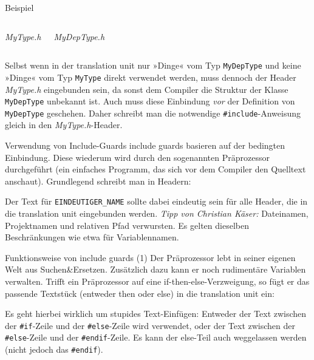 \begin{frame}[fragile]{Beispiel}
	\scriptsize
	\begin{columns}[t]
		\emph{MyType.h}
		
		
		\emph{MyDepType.h}
		
	\end{columns}
	
	\vspace{1em}
	{\footnotesize
	Selbst wenn in der translation unit nur »Dinge« vom Typ \verb|MyDepType| und keine »Dinge« vom Typ \verb|MyType| direkt verwendet werden, muss dennoch der Header \emph{MyType.h} eingebunden sein, da sonst dem Compiler die Struktur der Klasse \verb|MyDepType| unbekannt ist. Auch muss diese Einbindung \emph{vor} der Definition von \verb|MyDepType| geschehen. Daher schreibt man die notwendige \verb|#include|-Anweisung gleich in den \emph{MyType.h}-Header.
	}
\end{frame}

\begin{frame}[fragile]{Verwendung von Include-Guards}
	include guards basieren auf der bedingten Einbindung. Diese wiederum wird durch den sogenannten Präprozessor durchgeführt (ein einfaches Programm, das sich vor dem Compiler den Quelltext anschaut). Grundlegend schreibt man in Headern:
	
	\vspace{0.5em}
	\footnotesize
	
	\vspace{0.5em}
	
	\normalsize
	Der Text für \verb|EINDEUTIGER_NAME| sollte dabei eindeutig sein für alle Header, die in die translation unit eingebunden werden. \emph{Tipp von Christian Käser:} Dateinamen, Projektnamen und relativen Pfad verwursten. Es gelten dieselben Beschränkungen wie etwa für Variablennamen.
\end{frame}

\begin{frame}[fragile]{Funktionsweise von include guards (1)}
	Der Präprozessor lebt in seiner eigenen Welt aus Suchen\&Ersetzen. Zusätzlich dazu kann er noch rudimentäre Variablen verwalten. Trifft ein Präprozessor auf eine if-then-else-Verzweigung, so fügt er das passende Textstück (entweder then oder else) in die translation unit ein:
	
	\footnotesize
	

	\normalsize
	Es geht hierbei wirklich um stupides Text-Einfügen: Entweder der Text zwischen der \verb|#if|-Zeile und der \verb|#else|-Zeile wird verwendet, oder der Text zwischen der \verb|#else|-Zeile und der \verb|#endif|-Zeile. Es kann der else-Teil auch weggelassen werden (nicht jedoch das \verb|#endif|).
\end{frame}

